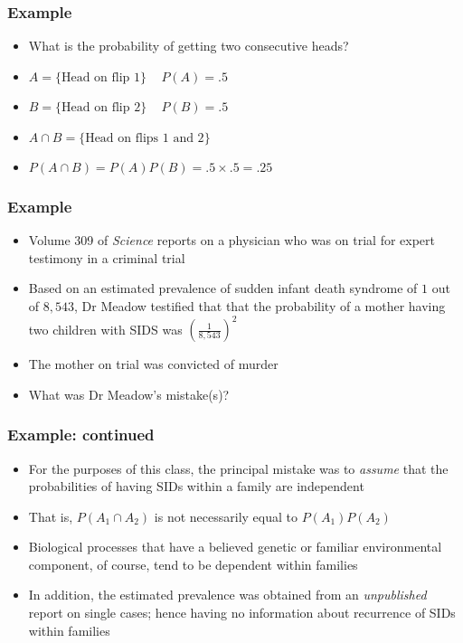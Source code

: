 \documentclass[aspectratio=169]{beamer}
\begin{document}
\begin{frame}\frametitle{Example}
  \begin{itemize}
  \item What is the probability of getting two consecutive heads?
  \item $A = \{\mbox{Head on flip 1}\}$ ~ $P(A) = .5$
  \item $B = \{\mbox{Head on flip 2}\}$ ~ $P(B) = .5$
  \item $A \cap B = \{\mbox{Head on flips 1 and 2}\}$
  \item $P(A \cap B) = P(A)P(B) = .5 \times .5 = .25$ 
  \end{itemize}
\end{frame}

\begin{frame} \frametitle{Example}
  \begin{itemize}
     \item Volume 309 of {\em Science} reports on a physician who was
       on trial for expert testimony in a criminal trial
     \item Based on an estimated prevalence of sudden infant death
       syndrome of $1$ out of $8,543$, Dr Meadow testified that 
       that the probability of a mother having two children with SIDS
       was $\left(\frac{1}{8,543}\right)^2$
     \item The mother on trial was convicted of murder
     \item What was Dr Meadow's mistake(s)?
  \end{itemize}
\end{frame}

\begin{frame}\frametitle{Example: continued}
  \begin{itemize}
    \item For the purposes of this class, the principal mistake was to
      {\em assume} that the probabilities of having SIDs within a family are
      independent
    \item That is, $P(A_1 \cap A_2)$ is not necessarily equal to $P(A_1)P(A_2)$
    \item Biological processes that have a believed genetic or familiar
      environmental component, of course, tend to be dependent within families
    \item In addition, the estimated prevalence was obtained from an
      {\em unpublished} report on single cases; hence having no information about
      recurrence of SIDs within families
  \end{itemize}
  
\end{frame}
\end{document}
